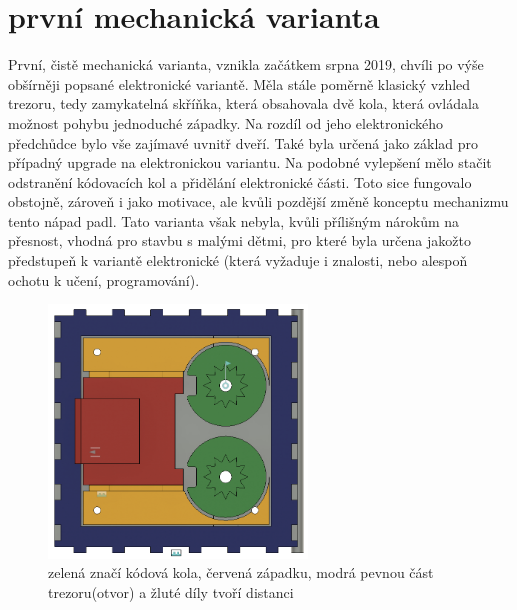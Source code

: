 \section*{první mechanická varianta}
První, čistě mechanická varianta, vznikla začátkem srpna 2019, chvíli po výše obšírněji popsané elektronické variantě.
Měla stále poměrně klasický vzhled trezoru, tedy zamykatelná skříňka, která obsahovala dvě kola, která ovládala možnost pohybu jednoduché západky.
Na rozdíl od jeho elektronického předchůdce bylo vše zajímavé uvnitř dveří. Také byla určená jako základ pro případný upgrade na elektronickou
variantu. Na podobné vylepšení mělo stačit odstranění kódovacích kol a přidělání elektronické části. Toto sice fungovalo obstojně, zároveň 
i jako motivace, ale kvůli pozdější změně konceptu mechanizmu tento nápad padl.
Tato varianta však nebyla, kvůli přílišným nárokům na přesnost, vhodná pro stavbu s malými dětmi, pro které byla určena jakožto předstupeň 
k variantě elektronické (která vyžaduje i znalosti, nebo alespoň ochotu k učení, programování).

\begin{figure}[htbp]
    \centering
    \includegraphics[width=260]{kapitoly/obrazky/M1/mechanizmus.png}
    \caption{zelená značí kódová kola, červená západku, modrá pevnou část trezoru(otvor) a žluté díly tvoří distanci}
    \label{fig:M1}
\end{figure}
\newpage